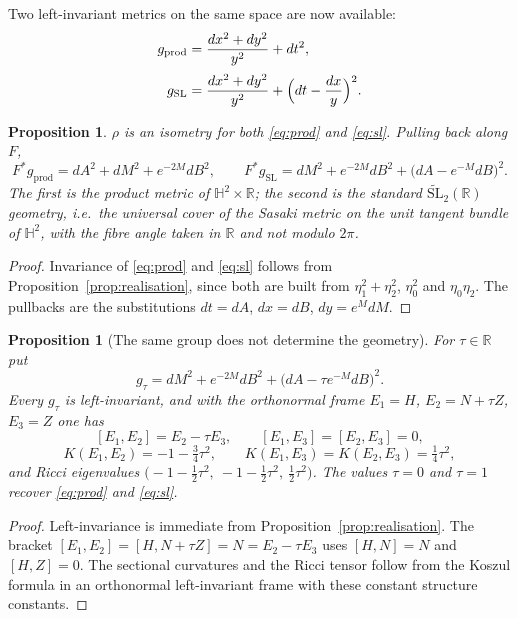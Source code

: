 \documentclass[11pt]{article}
\newtheorem{proposition}[theorem]{Proposition}
\begin{document}
Two left-invariant metrics on the same space are now available:
\begin{align}
g_{\mathrm{prod}}&=\frac{dx^2+dy^2}{y^2}+dt^2,
\label{eq:prod}\\[2pt]
g_{\mathrm{SL}}&=\frac{dx^2+dy^2}{y^2}+\Bigl(dt-\frac{dx}{y}\Bigr)^2 .
\label{eq:sl}
\end{align}

\begin{proposition}
\label{prop:two-metrics}
$\rho$ is an isometry for both \eqref{eq:prod} and \eqref{eq:sl}. Pulling back
along $F$,
\[
F^*g_{\mathrm{prod}}=dA^2+dM^2+e^{-2M}dB^2,
\qquad
F^*g_{\mathrm{SL}}=dM^2+e^{-2M}dB^2+\bigl(dA-e^{-M}dB\bigr)^2 .
\]
The first is the product metric of $\mathbb H^2\times\mathbb R$; the second is
the standard $\widetilde{\mathrm{SL}}_2(\mathbb R)$ geometry, i.e.\ the
universal cover of the Sasaki metric on the unit tangent bundle of $\mathbb H^2$,
with the fibre angle taken in $\mathbb R$ and not modulo $2\pi$.
\end{proposition}

\begin{proof}
Invariance of \eqref{eq:prod} and \eqref{eq:sl} follows from
Proposition~\ref{prop:realisation}, since both are built from
$\eta_1^2+\eta_2^2$, $\eta_0^2$ and $\eta_0\eta_2$. The pullbacks are the
substitutions $dt=dA$, $dx=dB$, $dy=e^MdM$.
\end{proof}

\begin{proposition}[The same group does not determine the geometry]
\label{prop:tau-family}
For $\tau\in\mathbb R$ put
\[
g_\tau=dM^2+e^{-2M}dB^2+\bigl(dA-\tau e^{-M}dB\bigr)^2 .
\]
Every $g_\tau$ is left-invariant, and with the orthonormal frame
$E_1=H$, $E_2=N+\tau Z$, $E_3=Z$ one has
\[
[E_1,E_2]=E_2-\tau E_3,\qquad [E_1,E_3]=[E_2,E_3]=0,
\]
\[
K(E_1,E_2)=-1-\tfrac34\tau^2,\qquad
K(E_1,E_3)=K(E_2,E_3)=\tfrac14\tau^2,
\]
and Ricci eigenvalues $\bigl(-1-\tfrac12\tau^2,\ -1-\tfrac12\tau^2,\ \tfrac12\tau^2\bigr)$.
The values $\tau=0$ and $\tau=1$ recover \eqref{eq:prod} and \eqref{eq:sl}.
\end{proposition}

\begin{proof}
Left-invariance is immediate from Proposition~\ref{prop:realisation}. The bracket
$[E_1,E_2]=[H,N+\tau Z]=N=E_2-\tau E_3$ uses $[H,N]=N$ and $[H,Z]=0$. The
sectional curvatures and the Ricci tensor follow from the Koszul formula in an
orthonormal left-invariant frame with these constant structure constants.
\end{proof}
\end{document}
